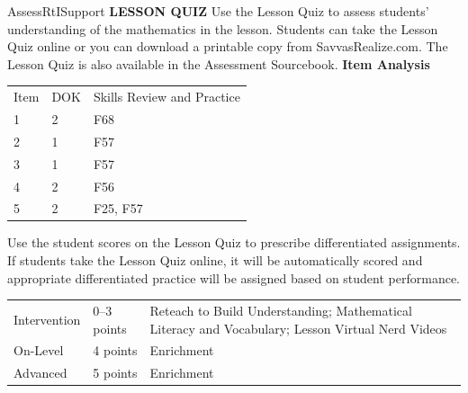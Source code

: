 \documentclass{article}
\newenvironment{te-addendum}[2]{}{}     %
\begin{document}
\begin{te-addendum}{Assess}{RtISupport}
\textbf{LESSON QUIZ}
Use the Lesson Quiz to assess students’ understanding of the mathematics in the lesson.
Students can take the Lesson Quiz online or you can download a printable copy from SavvasRealize.com. The Lesson Quiz is also available in the Assessment Sourcebook.
\textbf{Item Analysis}
\begin{tabular}{lll}
Item & DOK & Skills Review and Practice \\
1 & 2 & F68 \\
2 & 1 & F57 \\
3 & 1 & F57 \\
4 & 2 & F56 \\
5 & 2 & F25, F57 \\
\end{tabular}
Use the student scores on the Lesson Quiz to prescribe differentiated assignments.
If students take the Lesson Quiz online, it will be automatically scored and appropriate differentiated practice will be assigned based on student performance.
\begin{tabular}{lll}
Intervention & 0--3 points & Reteach to Build Understanding; Mathematical Literacy and Vocabulary; Lesson Virtual Nerd Videos \\
On-Level & 4 points & Enrichment \\
Advanced & 5 points & Enrichment \\
\end{tabular}
\end{te-addendum}
\end{document}
